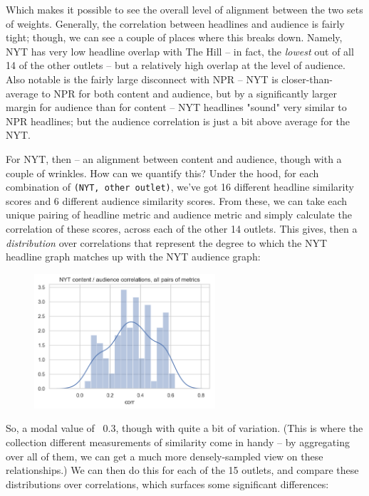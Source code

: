 \documentclass{scrartcl}
\begin{document}
Which makes it possible to see the overall level of alignment between the two sets of weights. Generally, the correlation between headlines and audience is fairly tight; though, we can see a couple of places where this breaks down. Namely, NYT has very low headline overlap with The Hill -- in fact, the \textit{lowest} out of all 14 of the other outlets -- but a relatively high overlap at the level of audience. Also notable is the fairly large disconnect with NPR -- NYT is closer-than-average to NPR for both content and audience, but by a significantly larger margin for audience than for content -- NYT headlines "sound" very similar to NPR headlines; but the audience correlation is just a bit above average for the NYT.

For NYT, then -- an alignment between content and audience, though with a couple of wrinkles. How can we quantify this? Under the hood, for each combination of \texttt{(NYT, other outlet)}, we've got 16 different headline similarity scores and 6 different audience similarity scores. From these, we can take each unique pairing of headline metric and audience metric and simply calculate the correlation of these scores, across each of the other 14 outlets. This gives, then a \textit{distribution} over correlations that represent the degree to which the NYT headline graph matches up with the NYT audience graph:

\begin{figure}[H]
  \centering
  \includegraphics[width=0.6\textwidth]{figures/nyt-corr-dist.png}
\end{figure}

So, a modal value of ~0.3, though with quite a bit of variation. (This is where the collection different measurements of similarity come in handy -- by aggregating over all of them, we can get a much more densely-sampled view on these relationships.) We can then do this for each of the 15 outlets, and compare these distributions over correlations, which surfaces some significant differences:
\end{document}
